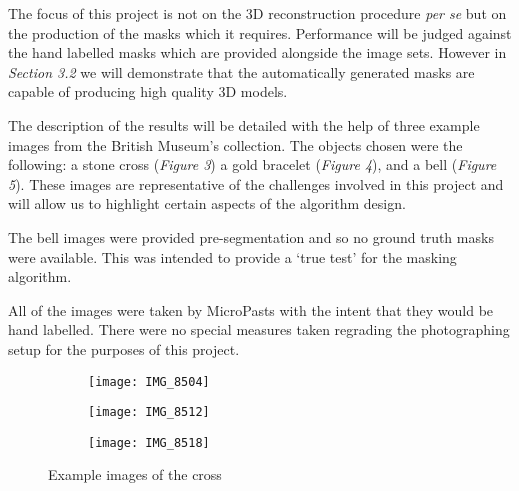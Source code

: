 \documentclass[12pt]{IIBproject}
\begin{document}


The focus of this project is not on the 3D reconstruction procedure \emph{per se} but on the production of the masks which it requires. Performance will be judged against the hand labelled masks which are provided alongside the image sets. However in \emph{Section 3.2} we will demonstrate that the automatically generated masks are capable of producing high quality 3D models.

The description of the results will be detailed with the help of three example images from the British Museum's collection. The objects chosen were the following: a stone cross (\emph{Figure 3}) a gold bracelet (\emph{Figure 4}), and a bell (\emph{Figure 5}). These images are representative of the challenges involved in this project and will allow us to highlight certain aspects of the algorithm design. 

The bell images were provided pre-segmentation and so no ground truth masks were available. This was intended to provide a `true test' for the masking algorithm.

All of the images were taken by MicroPasts with the intent that they would be hand labelled. There were no special measures taken regrading the photographing setup for the purposes of this project.




\begin{figure}[H]
\centering
\begin{subfigure}{.33\textwidth}
  \centering
  \texttt{[image: IMG\_8504]}
  \label{fig:sub1}
\end{subfigure}%
\begin{subfigure}{.33\textwidth}
  \centering
  \texttt{[image: IMG\_8512]}
  \label{fig:sub2}
\end{subfigure}
\begin{subfigure}{.33\textwidth}
  \centering
  \texttt{[image: IMG\_8518]}
  \label{fig:sub2}
\end{subfigure}
\caption{Example images of the cross}
\label{fig:test}
\end{figure}
\end{document}

